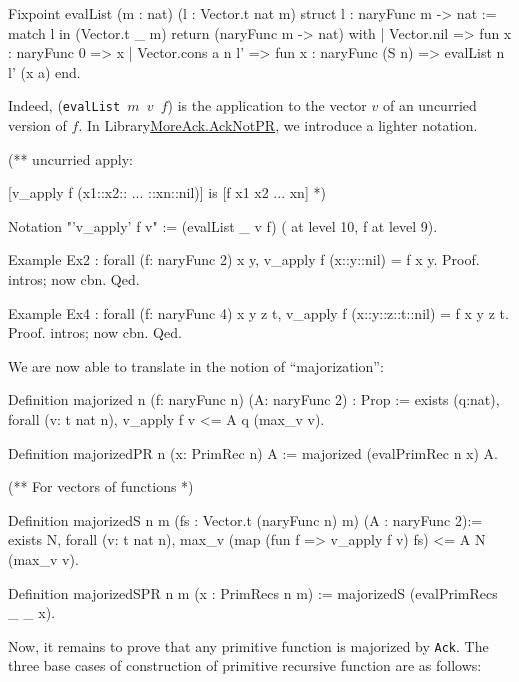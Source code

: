 \begin{Coqsrc}
Fixpoint evalList (m : nat) (l : Vector.t nat m) {struct l} :
 naryFunc m -> nat :=
  match l in (Vector.t _ m) return (naryFunc m -> nat) with
  | Vector.nil => fun x : naryFunc 0 => x
  | Vector.cons a n l' => fun x : naryFunc (S n) => evalList n l' (x a)
  end.
\end{Coqsrc}

Indeed, (\texttt{evalList $m$ $v$ $f$}) is the application to the vector $v$ of
an uncurried version of $f$.
In Library\href{../theories/html/hydras.MoreAck.AckNotPR.html}{MoreAck.AckNotPR}, we introduce a lighter notation.

\begin{Coqsrc}
(**  uncurried apply:
 
[v_apply f (x1::x2:: ... ::xn::nil)]  is [f x1 x2 ... xn] 
 *)

Notation "'v_apply' f v" := (evalList _ v f) ( at level 10, f at level 9).

Example Ex2 : forall (f: naryFunc 2) x y,
    v_apply f (x::y::nil) = f x y.
Proof.   intros; now cbn. Qed.

Example Ex4 : forall (f: naryFunc 4) x y z t,
    v_apply f (x::y::z::t::nil) = f x y z t.
Proof.  intros; now cbn. Qed.
\end{Coqsrc}

We are now able to translate in \gallina{} the notion of ``majorization'':

\begin{Coqsrc}
Definition majorized {n} (f: naryFunc n) (A: naryFunc 2) : Prop :=
  exists (q:nat), forall (v: t nat n),
      v_apply f v <= A q  (max_v v).

Definition majorizedPR {n} (x: PrimRec n) A := 
           majorized (evalPrimRec n x) A.

(** For vectors of functions *)

Definition majorizedS {n m} (fs : Vector.t (naryFunc n) m)
           (A : naryFunc 2):=
  exists N, forall (v: t nat n),
      max_v (map (fun f => v_apply f v) fs) <= A N (max_v v).

Definition majorizedSPR {n m} (x : PrimRecs n m) :=
  majorizedS (evalPrimRecs _ _ x).
\end{Coqsrc}

Now, it remains to prove that any primitive function is majorized by \texttt{Ack}.
The three base cases of construction of primitive recursive function are as follows:

